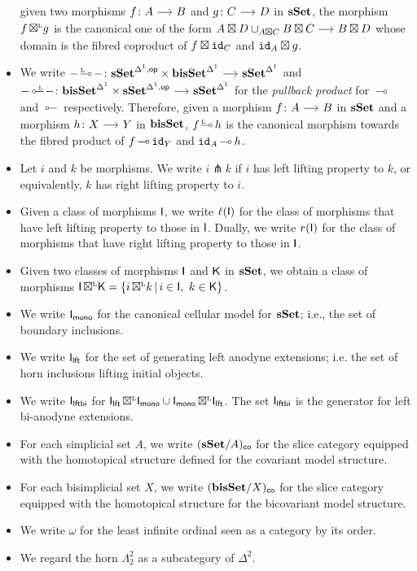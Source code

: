 \documentclass[a4paper,  dvipsnames, 11pt]{amsart}
\begin{document}
\begin{notation}
\begin{itemize}
			given two morphisms $f\colon A\arr B$ and $g\colon C\arr D$ in $\mathbf{sSet}$, the morphism $f{\mathrel{\,\boxtimes^{\text{\tiny{L}}}}} g$ is the canonical one of the form
			$A\boxtimes D \cup_{A\boxtimes C} B\boxtimes C\arr B\boxtimes D$ whose domain is the fibred coproduct of $f\boxtimes \mathtt{id}_{C}$ and $\mathtt{id}_{A}\boxtimes g$.
		\item %
			We write
			$-\rollipopL-\colon\sSet^{\ra,\op}\times\bisSet^\ra\arr\sSet^\ra$
			and
			$-\lollipopL-\colon\bisSet^\ra\times\sSet^{\ra,\op}\arr\sSet^\ra$
			for the \textit{pullback product} for $\rollipop$ and $\lollipop$ respectively.
			Therefore, given a morphism $f\colon A \arr B$ in $\mathbf{sSet}$ and a morphism $h\colon X\arr Y$ in $\mathbf{bisSet}$,
			$f\rollipopL h$ is the canonical morphism towards the fibred product of $f\rollipop \id_Y$ and $\id_A\rollipop h$.
		\item %
			Let $i$ and $k$ be morphisms.
			We write $i\pitchfork k$ if $i$ has left lifting property to $k$, or equivalently,
			$k$ has right lifting property to $i$.
		\item
			Given a class of morphisms $\mathsf{I}$,
			we write $\ell(\mathsf{I})$ for the class of morphisms that have left lifting property to those in $\mathsf{I}$.
			Dually, we write $r(\mathsf{I})$ for the class of morphisms that have right lifting property to those in $\mathsf{I}$.
		\item %
			Given two classes of morphisms $\mathsf{I}$ and $\mathsf{K}$ in $\mathbf{sSet}$,
			we obtain a class of morphisms $\mathsf{I}{\mathrel{\,\boxtimes^{\text{\tiny{L}}}}}\mathsf{K}=\{ i{\mathrel{\,\boxtimes^{\text{\tiny{L}}}}} k\,|\,i\in\mathsf{I},\ k\in\mathsf{K} \}$.
		\item %
			We write $\mathsf{I}_{\mathsf{mono}}$ for the canonical cellular model for $\mathbf{sSet}$; i.e., the set of boundary inclusions.
		\item %
			We write $\mathsf{I}_{\mathsf{lft}}$ for the set of generating left anodyne extensions; i.e. the set of horn inclusions lifting initial objects.
		\item %
			We write $\mathsf{I}_{\mathsf{lftbi}}$ for $\mathsf{I}_{\mathsf{lft}}{\mathrel{\,\boxtimes^{\text{\tiny{L}}}}}\mathsf{I}_{\mathsf{mono}}\cup\mathsf{I}_{\mathsf{mono}}{\mathrel{\,\boxtimes^{\text{\tiny{L}}}}}\mathsf{I}_{\mathsf{lft}}$.
			The set
			$\mathsf{I}_{\mathsf{lftbi}}$ is the generator for left bi-anodyne extensions.
		\item %
			For each simplicial set $A$,
			we write $(\mathbf{sSet}/A)_{\mathsf{co}}$ for the slice category equipped with the homotopical structure defined for the covariant model structure.
		\item %
			For each bisimplicial set $X$,
			we write $(\mathbf{bisSet}/X)_{\mathsf{co}}$ for the slice category equipped with the homotopical structure for the bicovariant model structure.
		\item %
			We write $\omega$ for the least infinite ordinal seen as a category by its order.
		\item %
			We regard the horn $\Lambda^2_2$ as a subcategory of $\Delta^2$.
		\qedhere %
	\end{itemize}
\end{notation}
\end{document}
